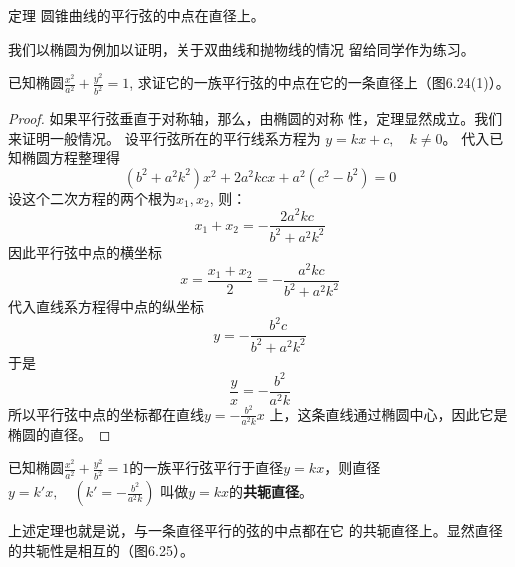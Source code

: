 \begin{blk}
  {定理} 圆锥曲线的平行弦的中点在直径上。
\end{blk}

我们以椭圆为例加以证明，关于双曲线和抛物线的情况
留给同学作为练习。

已知椭圆$\frac{x^2}{a^2}+\frac{y^2}{b^2}=1$, 求证它的一族平行弦的中点在它的一条直径上（图6.24(1)）。

\begin{proof}
    如果平行弦垂直于对称轴，那么，由椭圆的对称
性，定理显然成立。我们来证明一般情况。
设平行弦所在的平行线系方程为
$y=kx+c,\quad k\ne 0$。
代入已知椭圆方程整理得
\[(b^2+a^2k^2)x^2+2a^2kcx+a^2(c^2-b^2)=0\]
设这个二次方程的两个根为$x_1,x_2$, 则：
\[x_1+x_2=-\frac{2a^2kc}{b^2+a^2k^2}\]
因此平行弦中点的横坐标
\[x=\frac{x_1+x_2}{2}=-\frac{a^2kc}{b^2+a^2k^2}\]
代入直线系方程得中点的纵坐标
\[y=-\frac{b^2c}{b^2+a^2k^2}\]
于是
\[\frac{y}{x}=-\frac{b^2}{a^2k}\]
所以平行弦中点的坐标都在直线$y=-\frac{b^2}{a^2k}x$
上，这条直线通过椭圆中心，因此它是椭圆的直径。
\end{proof}

已知椭圆$\frac{x^2}{a^2}+\frac{y^2}{b^2}=1$的一族平行弦平行于直径$y=kx$，则直径$y=k'x,\quad \left(k'=-\frac{b^2}{a^2k}\right)$
叫做$y=kx$的\textbf{共轭直径}。

上述定理也就是说，与一条直径平行的弦的中点都在它
的共轭直径上。显然直径的共轭性是相互的（图6.25）。

\begin{figure}[htp]\centering
    \begin{minipage}[t]{0.48\textwidth}
    \centering
{}
    \caption{}
    \end{minipage}
    \begin{minipage}[t]{0.48\textwidth}
    \centering
    \caption{}
    \end{minipage}
    \end{figure}

